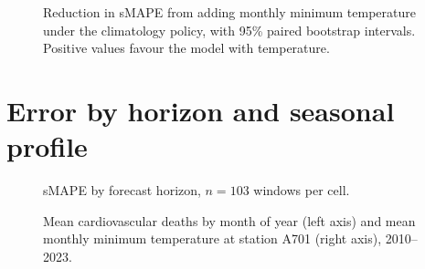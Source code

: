\begin{figure}[htbp]
\centering

\caption{Reduction in sMAPE from adding monthly minimum temperature under the climatology
policy, with 95\% paired bootstrap intervals. Positive values favour the model with
temperature.}
\label{fig:temp}
\end{figure}

\section{Error by horizon and seasonal profile}

\begin{figure}[htbp]
\centering

\caption{sMAPE by forecast horizon, $n=103$ windows per cell.}
\label{fig:horizonte}
\end{figure}

\begin{figure}[htbp]
\centering

\caption{Mean cardiovascular deaths by month of year (left axis) and mean monthly minimum
temperature at station A701 (right axis), 2010--2023.}
\label{fig:sazonal}
\end{figure}
